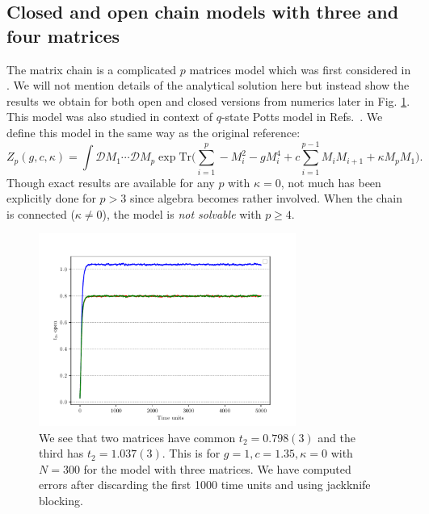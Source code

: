 \documentclass[letter,11pt]{article}
\begin{document}
\subsection{\label{subsection:Mchain}Closed and open chain models with three and four matrices}
The matrix chain is a complicated $p$ matrices model which was first considered in \cite{Chadha:1980ri}. We will not mention details of the analytical solution here but instead show the results we obtain for both open and closed versions from numerics later in Fig. \ref{fig:3MM_open}. This model was also studied in context 
of $q$-state Potts model in Refs.~\cite{KAZAKOV198893, KOSTOV1989295, Daul:1994qy}. We define this model in the same way as the original reference: 
\begin{equation}
	\label{eq:Mehta1} 
	Z_{p}(g,c,\kappa) = \int \mathcal{D}M_{1} \cdots  \mathcal{D}M_{p} \exp \mathrm{Tr}\Bigg(\sum_{i=1}^{p} -M_{i}^2  - g M_{i}^{4} + c \sum_{i=1}^{p-1} M_{i}M_{i+1} 
	+ \kappa M_{p}M_{1} \Bigg).
\end{equation} 
Though exact results are available for any $p$ with $\kappa=0$, not much has been explicitly done for $p > 3$ since algebra becomes rather involved. When the chain is connected ($\kappa \neq 0$), the model is \emph{not solvable} with $p \ge 4$. 
\begin{figure}[htbp] 
	\centering 
	\includegraphics[width=0.75\textwidth]{figs/3MM_open.pdf}
	\caption{\label{fig:3MM_open}We see that two matrices have common $t_{2} = 0.798(3)$ and the third has 
		$t_{2} = 1.037(3)$. This is for $g=1, c=1.35, \kappa=0$ with $N=300$ for the model with three matrices. 
		We have computed errors after discarding the first 1000 time units and using jackknife blocking.}
\end{figure}
\end{document}
